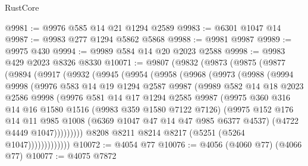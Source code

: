\begin{lexlean}{RustCore}
\begin{coremodule}
@9981 := @9976 @585 @14 @21 @1294 @2589
@9983 := @6301 @1047 @14
@9987 := @9983 @277 @1294 @5862 @5868
@9988 := @9981 @9987
@9989 := @9975 @430
@9994 := @9989 @584 @14 @20 @2023 @2588
@9998 := @9983 @429 @2023 @8326 @8330
@10071 := @9807
    (@9832
      (@9873
        (@9875
          (@9877
            (@9894
              (@9917
                (@9932
                  (@9945
                    (@9954
                      (@9958
                        (@9968
                          (@9973
                            (@9988
                              (@9994
                                @9998
                                (@9976
                                  @583
                                  @14
                                  @19
                                  @1294
                                  @2587
                                  @9987
                                  (@9989
                                    @582
                                    @14
                                    @18
                                    @2023
                                    @2586
                                    @9998
                                    (@9976
                                      @581
                                      @14
                                      @17
                                      @1294
                                      @2585
                                      @9987
                                      (@9975
                                        @360
                                        @316
                                        @14
                                        @16
                                        @1580
                                        @1516
                                        (@9983 @359 @1580 @7122 @7126)
                                        (@9975
                                          @152
                                          @176
                                          @14
                                          @11
                                          @985
                                          @1008
                                          (@6369 @1047 @47 @14 @47 @985 @6377 @4537)
                                          (@4722 @4449 @1047)))))))))
                          @8208
                          @8211
                          @8214
                          @8217
                          (@5251 (@5264 @1047)))))))))))))
@10072 := @4054 @77
@10076 := @4056 (@4060 @77) (@4066 @77)
@10077 := @4075 @7872

\end{coremodule}
\end{lexlean}
